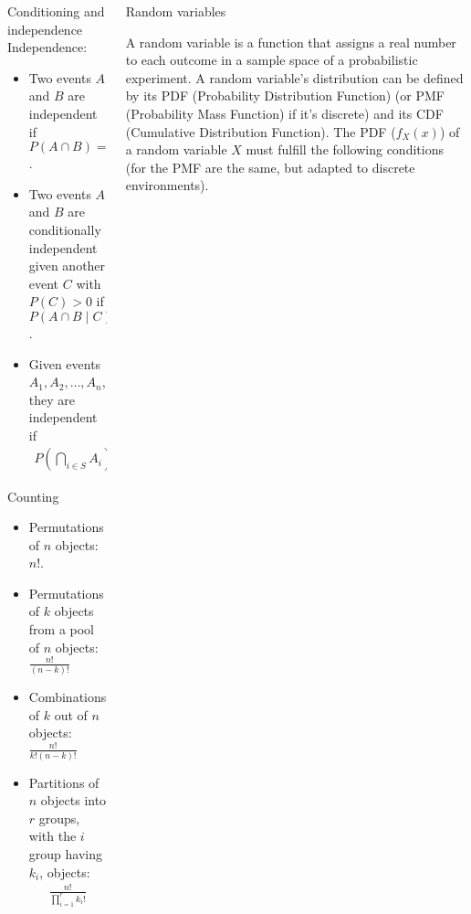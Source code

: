 \documentclass{beamer}
\begin{document}
\begin{frame}
\begin{columns}
\begin{column}{0.3\textwidth}
\begin{block}{Conditioning and independence}
Independence:

\begin{itemize}
    \item Two events $A$ and $B$ are independent if $P(A \cap B) = P(A)P(B)$.
    \item Two events $A$ and $B$ are conditionally independent given another event $C$ with $P(C) > 0$ if $P(A \cap B \mid C) = P(A \mid C)P(B \mid C)$.
    \item Given events $A_1, A_2, \ldots, A_n$, they are independent if
    \begin{align*}
        P(\bigcap_{i \in S} A_i) = \prod_{i \in S} P(A_i), \text{for every subset } S \text{ of } \{1, 2, \ldots, n\}.
    \end{align*}
\end{itemize}

\end{block}

\begin{block}{Counting}

\begin{itemize}
    \item Permutations of $n$ objects: $n!$.
    \item Permutations of $k$ objects from a pool of $n$ objects: $\frac{n!}{(n - k)!}$
    \item Combinations of $k$ out of $n$ objects: $\frac{n!}{k!(n-k)!}$
    \item Partitions of $n$ objects into $r$ groups, with the $i$ group having $k_i$, objects:
        \begin{align*}
            \frac{n!}{\prod_{i=1}^r k_i!}
        \end{align*}
\end{itemize}

\end{block}

\end{column}

\begin{column}{0.3\textwidth}
\begin{block}{Random variables}

A random variable is a function that assigns a real number to each outcome in a sample space of a probabilistic experiment. A random variable's distribution can be defined by its PDF (Probability Distribution Function) (or PMF (Probability Mass Function) if it's discrete) and its CDF (Cumulative Distribution Function). The PDF ($f_X(x)$) of a random variable $X$ must fulfill the following conditions (for the PMF are the same, but adapted to discrete environments).


\end{block}
\end{column}
\end{columns}
\end{frame}
\end{document}
